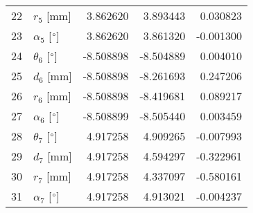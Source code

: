 \documentclass{standalone}%
\begin{document}
\begin{tabular}{llrrr}
22 &              $r_{5}$ [mm] &  3.862620 &   3.893443 &   0.030823 \\
23 &  $\alpha_{5}$ [$\degree$] &  3.862620 &   3.861320 &  -0.001300 \\
24 &  $\theta_{6}$ [$\degree$] & -8.508898 &  -8.504889 &   0.004010 \\
25 &              $d_{6}$ [mm] & -8.508898 &  -8.261693 &   0.247206 \\
26 &              $r_{6}$ [mm] & -8.508898 &  -8.419681 &   0.089217 \\
27 &  $\alpha_{6}$ [$\degree$] & -8.508899 &  -8.505440 &   0.003459 \\
28 &  $\theta_{7}$ [$\degree$] &  4.917258 &   4.909265 &  -0.007993 \\
29 &              $d_{7}$ [mm] &  4.917258 &   4.594297 &  -0.322961 \\
30 &              $r_{7}$ [mm] &  4.917258 &   4.337097 &  -0.580161 \\
31 &  $\alpha_{7}$ [$\degree$] &  4.917258 &   4.913021 &  -0.004237 \\
\bottomrule
\end{tabular}
%
\end{document}
